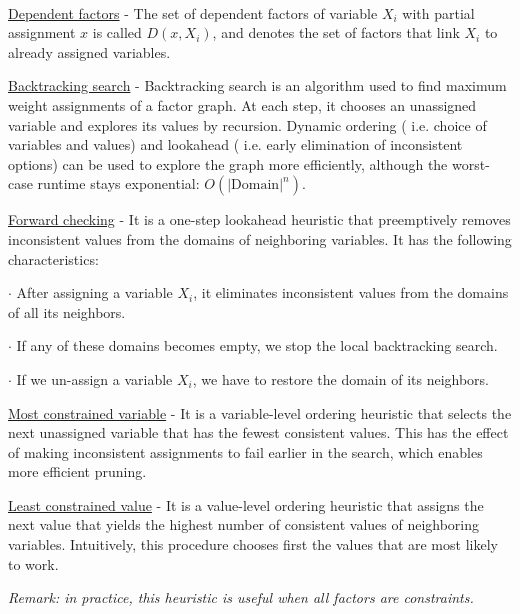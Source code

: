 \documentclass[4pt,landscape]{article}
\begin{document}
\begin{multicols*}{4}
{\color{magenta} \hrulefill}\\
 {\tiny \underline{Dependent factors} - The set of dependent factors of variable $X_i$ with partial assignment $x$ is called $D(x,X_i)$, and denotes the set of factors that link $X_i$ to already assigned variables.}\par
 {\tiny \underline{Backtracking search} - Backtracking search is an algorithm used to find maximum weight assignments of a factor graph. At each step, it chooses an unassigned variable and explores its values by recursion. Dynamic ordering ( i.e. choice of variables and values) and lookahead ( i.e. early elimination of inconsistent options) can be used to explore the graph more efficiently, although the worst-case runtime stays exponential: $O(|\text{Domain}|^n)$.}\par
 {\tiny \underline{Forward checking} - It is a one-step lookahead heuristic that preemptively removes inconsistent values from the domains of neighboring variables. It has the following characteristics:}\par
 {$\cdot$ After assigning a variable $X_i$, it eliminates inconsistent values from the domains of all its neighbors.}\par
 {$\cdot$ If any of these domains becomes empty, we stop the local backtracking search.}\par
 {$\cdot$ If we un-assign a variable $X_i$, we have to restore the domain of its neighbors.}\par
 {\tiny \underline{Most constrained variable} - It is a variable-level ordering heuristic that selects the next unassigned variable that has the fewest consistent values. This has the effect of making inconsistent assignments to fail earlier in the search, which enables more efficient pruning.}\par
 {\tiny \underline{Least constrained value} - It is a value-level ordering heuristic that assigns the next value that yields the highest number of consistent values of neighboring variables. Intuitively, this procedure chooses first the values that are most likely to work.} \par
 {\tiny \textit{Remark: in practice, this heuristic is useful when all factors are constraints.}}\par
 \newpage


\end{multicols*}
\end{document}
